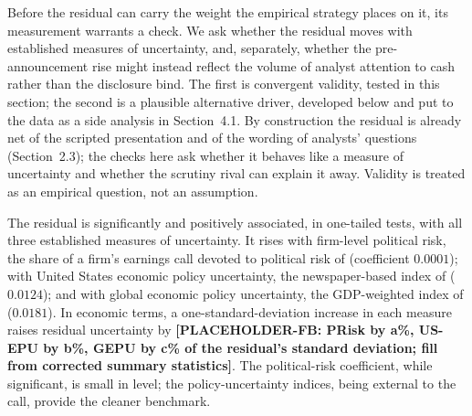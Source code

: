 
Before the residual can carry the weight the empirical strategy places on it, its measurement warrants a check. We ask whether the residual moves with established measures of uncertainty, and, separately, whether the pre-announcement rise might instead reflect the volume of analyst attention to cash rather than the disclosure bind. The first is convergent validity, tested in this section; the second is a plausible alternative driver, developed below and put to the data as a side analysis in Section~4.1. By construction the residual is already net of the scripted presentation and of the wording of analysts' questions (Section~2.3); the checks here ask whether it behaves like a measure of uncertainty and whether the scrutiny rival can explain it away. Validity is treated as an empirical question, not an assumption.

The residual is significantly and positively associated, in one-tailed tests, with all three established measures of uncertainty. It rises with firm-level political risk, the share of a firm's earnings call devoted to political risk of \citet{hassan2020} (coefficient $0.0001$); with United States economic policy uncertainty, the newspaper-based index of \citet{baker2016} ($0.0124$); and with global economic policy uncertainty, the GDP-weighted index of \citet{davis2016} ($0.0181$). In economic terms, a one-standard-deviation increase in each measure raises residual uncertainty by \textbf{[PLACEHOLDER-FB: PRisk by a\%, US-EPU by b\%, GEPU by c\% of the residual's standard deviation; fill from corrected summary statistics]}. The political-risk coefficient, while significant, is small in level; the policy-uncertainty indices, being external to the call, provide the cleaner benchmark.

